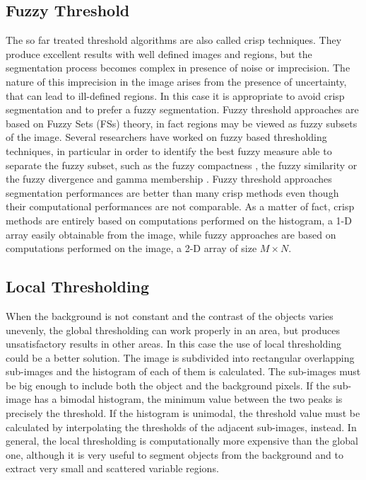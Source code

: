 \documentclass[final,a4paper,12pt,english]{UnicaPhdThesis3}
\begin{document}
\subsection{Fuzzy Threshold} %
The so far treated threshold algorithms are also called crisp techniques. They produce excellent results with well defined images and regions, but the segmentation process becomes complex in presence of noise or imprecision. The nature of this imprecision in the image arises from the presence of uncertainty, that can lead to ill-defined regions. In this case it is appropriate to avoid crisp segmentation and to prefer a fuzzy segmentation. Fuzzy threshold approaches are based on Fuzzy Sets (\acs{FS}s) theory, in fact regions may be viewed as fuzzy subsets of the image. Several researchers have worked on fuzzy based thresholding techniques, in particular in order to identify the best fuzzy measure able to separate the fuzzy subset, such as the fuzzy compactness \cite{Pal}, the fuzzy similarity \cite{Ramar} or the fuzzy divergence and gamma membership \cite{Cha03, MeloP}.
Fuzzy threshold approaches segmentation performances are better than many crisp methods even though their computational performances are not comparable. As a matter of fact, crisp methods are entirely based on computations performed on the histogram, a 1-D array easily obtainable from the image, while fuzzy approaches are based on computations performed on the image, a 2-D array of size $M \times N$.

\subsection{Local Thresholding} \label{LT} %
When the background is not constant and the contrast of the objects varies unevenly, the global thresholding can work properly in an area, but produces unsatisfactory results in other areas. In this case the use of local thresholding could be a better solution. The image is subdivided into rectangular overlapping sub-images and the histogram of each of them is calculated. The sub-images must be big enough to include both the object and the background pixels. If the sub-image has a bimodal histogram, the minimum value between the two peaks is precisely the threshold. If the histogram is unimodal, the threshold value must be calculated by interpolating the thresholds of the adjacent sub-images, instead. In general, the local thresholding is computationally more expensive than the global one, although it is very useful to segment objects from the background and to extract very small and scattered variable regions.
\end{document}
